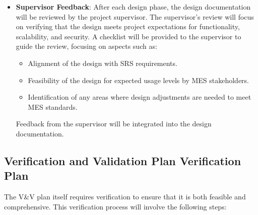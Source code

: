 \documentclass[12pt, titlepage]{article}
\begin{document}
\begin{itemize}
    \item \textbf{Supervisor Feedback}: After each design phase, the design documentation will be reviewed by the project supervisor. The supervisor’s review will focus on verifying that the design meets project expectations for functionality, scalability, and security. A checklist will be provided to the supervisor to guide the review, focusing on aspects such as:
    \begin{itemize}
        \item Alignment of the design with SRS requirements.
        \item Feasibility of the design for expected usage levels by MES stakeholders.
        \item Identification of any areas where design adjustments are needed to meet MES standards.
    \end{itemize}
    Feedback from the supervisor will be integrated into the design documentation.
\end{itemize}

\subsection{Verification and Validation Plan Verification Plan}
The V\&V plan itself requires verification to ensure that it is both feasible and comprehensive. This verification process will involve the following steps:
\end{document}
